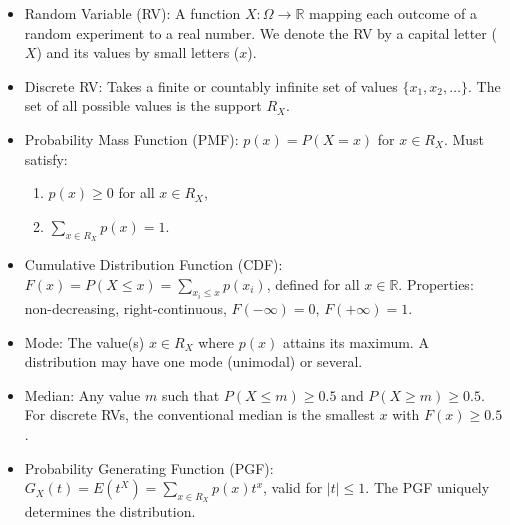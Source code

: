 \documentclass[11pt]{article}
\newcommand{\cle}[1]{{\popxbold\color{popdark}#1}}
\begin{document}
\begin{aretenir}
\begin{itemize}
    \item \cle{Random Variable (RV)}: A function $X: \Omega \to \mathbb{R}$ mapping each outcome of a random experiment to a real number. We denote the RV by a capital letter ($X$) and its values by small letters ($x$).
    \item \cle{Discrete RV}: Takes a finite or countably infinite set of values $\{x_1, x_2, \dots\}$. The set of all possible values is the \cle{support} $R_X$.
    \item \cle{Probability Mass Function (PMF)}: $p(x) = P(X=x)$ for $x \in R_X$. Must satisfy:
          \begin{enumerate}
              \item $p(x) \ge 0$ for all $x \in R_X$,
              \item $\sum_{x \in R_X} p(x) = 1$.
          \end{enumerate}
    \item \cle{Cumulative Distribution Function (CDF)}: $F(x) = P(X \le x) = \sum_{x_i \le x} p(x_i)$, defined for all $x \in \mathbb{R}$. Properties: non-decreasing, right-continuous, $F(-\infty)=0$, $F(+\infty)=1$.
    \item \cle{Mode}: The value(s) $x \in R_X$ where $p(x)$ attains its maximum. A distribution may have one mode (unimodal) or several.
    \item \cle{Median}: Any value $m$ such that $P(X \le m) \ge 0.5$ and $P(X \ge m) \ge 0.5$. For discrete RVs, the conventional median is the smallest $x$ with $F(x) \ge 0.5$.
    \item \cle{Probability Generating Function (PGF)}: $G_X(t) = E(t^X) = \sum_{x \in R_X} p(x) t^x$, valid for $|t| \le 1$. The PGF uniquely determines the distribution.
\end{itemize}
\end{aretenir}
\end{document}
